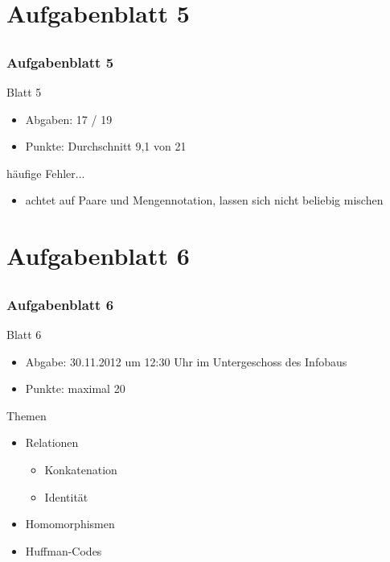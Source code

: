 
\section[Blatt 5]{Aufgabenblatt 5}
\subsection*{}
\begin{frame}
	\frametitle{Aufgabenblatt 5}
	\begin{block}{Blatt 5}
		\begin{itemize}
			\item Abgaben: 17 / 19
			\item Punkte: Durchschnitt 9,1 von 21
		\end{itemize}
  \end{block}
  
	\begin{block}{häufige Fehler...}
		\begin{itemize}
			\item[5.4:] achtet auf Paare und Mengennotation, lassen sich nicht beliebig mischen
		 \end{itemize}
	\end{block}
\end{frame}

\section[Blatt 6]{Aufgabenblatt 6}
\subsection*{}
\begin{frame}
	\frametitle{Aufgabenblatt 6}
	\begin{block}{Blatt 6}
		\begin{itemize}
			\item Abgabe: 30.11.2012 um 12:30 Uhr im Untergeschoss des Infobaus
			\item Punkte: maximal 20
		\end{itemize}
  \end{block}
	\begin{block}{Themen}
		\begin{itemize}
	  		\item Relationen
		\begin{itemize}
	  		\item Konkatenation
	  		\item Identität
	  \end{itemize}
	  		\item Homomorphismen
	  		\item Huffman-Codes
	  \end{itemize}
	\end{block}
\end{frame}
